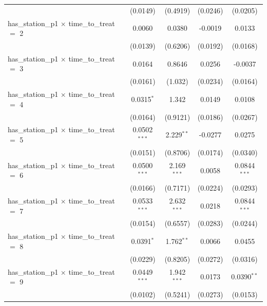 \documentclass{article}
\begin{document}
\begin{appendices}
\begin{table}[ht]
{\begin{tabular}{lcccc}
                                                         & (0.0149)       & (0.4919)      & (0.0246) & (0.0205)\\   
   has\_station\_p1 $\times$ time\_to\_treat $=$ 2       & 0.0060         & 0.0380        & -0.0019  & 0.0133\\   
                                                         & (0.0139)       & (0.6206)      & (0.0192) & (0.0168)\\   
   has\_station\_p1 $\times$ time\_to\_treat $=$ 3       & 0.0164         & 0.8646        & 0.0256   & -0.0037\\   
                                                         & (0.0161)       & (1.032)       & (0.0234) & (0.0164)\\   
   has\_station\_p1 $\times$ time\_to\_treat $=$ 4       & 0.0315$^{*}$   & 1.342         & 0.0149   & 0.0108\\   
                                                         & (0.0164)       & (0.9121)      & (0.0186) & (0.0267)\\   
   has\_station\_p1 $\times$ time\_to\_treat $=$ 5       & 0.0502$^{***}$ & 2.229$^{**}$  & -0.0277  & 0.0275\\   
                                                         & (0.0151)       & (0.8706)      & (0.0174) & (0.0340)\\   
   has\_station\_p1 $\times$ time\_to\_treat $=$ 6       & 0.0500$^{***}$ & 2.169$^{***}$ & 0.0058   & 0.0844$^{***}$\\   
                                                         & (0.0166)       & (0.7171)      & (0.0224) & (0.0293)\\   
   has\_station\_p1 $\times$ time\_to\_treat $=$ 7       & 0.0533$^{***}$ & 2.632$^{***}$ & 0.0218   & 0.0844$^{***}$\\   
                                                         & (0.0154)       & (0.6557)      & (0.0283) & (0.0244)\\   
   has\_station\_p1 $\times$ time\_to\_treat $=$ 8       & 0.0391$^{*}$   & 1.762$^{**}$  & 0.0066   & 0.0455\\   
                                                         & (0.0229)       & (0.8205)      & (0.0272) & (0.0316)\\   
   has\_station\_p1 $\times$ time\_to\_treat $=$ 9       & 0.0449$^{***}$ & 1.942$^{***}$ & 0.0173   & 0.0390$^{**}$\\   
                                                         & (0.0102)       & (0.5241)      & (0.0273) & (0.0153)\\   

\end{tabular}}
\end{table}
\end{appendices}
\end{document}
